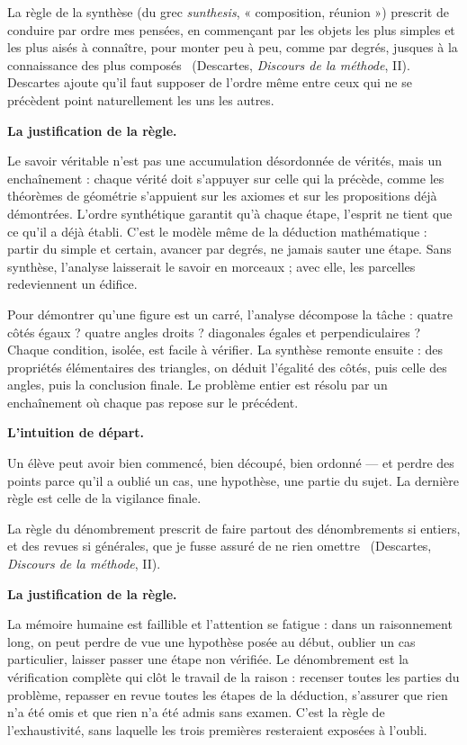 \documentclass[11pt]{article}
\newcommand{\cle}[1]{{\popxbold\color{popdark}#1}}
\newcounter{popsec}
\newcounter{popsub}
\newcommand{\courssub}[1]{%
  \stepcounter{popsub}%
  \par\vspace{9pt}\noindent{\popxbold\fontsize{11.5}{13}\selectfont\color{popink}{\color{poporange}\thepopsec.\thepopsub}\hspace{6pt}#1}\par\nopagebreak\vspace{4pt}
}
\begin{document}
La règle de la \cle{synthèse} (du grec \emph{sunthesis}, « composition, réunion ») prescrit de \guillemotleft conduire par ordre mes pensées, en commençant par les objets les plus simples et les plus aisés à connaître, pour monter peu à peu, comme par degrés, jusques à la connaissance des plus composés \guillemotright\ (Descartes, \emph{Discours de la méthode}, II). Descartes ajoute qu'il faut supposer de l'ordre même entre ceux qui ne se précèdent point naturellement les uns les autres.

\textbf{La justification de la règle.}\par
Le savoir véritable n'est pas une accumulation désordonnée de vérités, mais un \cle{enchaînement} : chaque vérité doit s'appuyer sur celle qui la précède, comme les théorèmes de géométrie s'appuient sur les axiomes et sur les propositions déjà démontrées. L'ordre synthétique garantit qu'à chaque étape, l'esprit ne tient que ce qu'il a déjà établi. C'est le modèle même de la déduction mathématique : partir du simple et certain, avancer par degrés, ne jamais sauter une étape. Sans synthèse, l'analyse laisserait le savoir en morceaux ; avec elle, les parcelles redeviennent un édifice.

\begin{exemplebox}
Pour démontrer qu'une figure est un carré, l'analyse décompose la tâche : quatre côtés égaux ? quatre angles droits ? diagonales égales et perpendiculaires ? Chaque condition, isolée, est facile à vérifier. La synthèse remonte ensuite : des propriétés élémentaires des triangles, on déduit l'égalité des côtés, puis celle des angles, puis la conclusion finale. Le problème entier est résolu par un enchaînement où chaque pas repose sur le précédent.
\end{exemplebox}

\courssub{Quatrième règle : le dénombrement}

\textbf{L'intuition de départ.}\par
Un élève peut avoir bien commencé, bien découpé, bien ordonné — et perdre des points parce qu'il a oublié un cas, une hypothèse, une partie du sujet. La dernière règle est celle de la vigilance finale.

La règle du \cle{dénombrement} prescrit de \guillemotleft faire partout des dénombrements si entiers, et des revues si générales, que je fusse assuré de ne rien omettre \guillemotright\ (Descartes, \emph{Discours de la méthode}, II).

\textbf{La justification de la règle.}\par
La mémoire humaine est faillible et l'attention se fatigue : dans un raisonnement long, on peut perdre de vue une hypothèse posée au début, oublier un cas particulier, laisser passer une étape non vérifiée. Le dénombrement est la \cle{vérification complète} qui clôt le travail de la raison : recenser toutes les parties du problème, repasser en revue toutes les étapes de la déduction, s'assurer que rien n'a été omis et que rien n'a été admis sans examen. C'est la règle de l'exhaustivité, sans laquelle les trois premières resteraient exposées à l'oubli.
\end{document}
